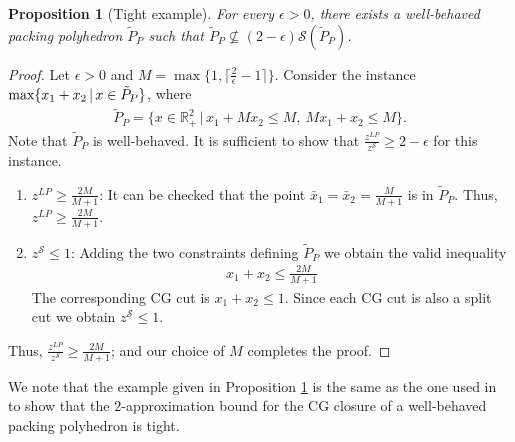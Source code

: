 \documentclass[11pt]{article}
\newcommand{\R}{\mathbb{R}}
\newcommand{\A}{\mathcal{A}}
\renewcommand{\S}{\mathcal{S}}
\newtheorem{proposition}{Proposition}
\begin{document}
\begin{proposition}[Tight example]
\label{prop:pack_TightEx}
For every $\epsilon >0$, there exists a well-behaved packing polyhedron $\tilde{P}_P$ such that $\tilde{P}_P \not\subseteq (2-\epsilon) \S(\tilde{P}_P)$. 
\end{proposition}

\begin{proof}
Let $\epsilon > 0$ and $M = \max\{1,\lceil \frac{2}{\epsilon}-1 \rceil \}$.
Consider the instance 
$\textup{max} \{ x_1 + x_2 \,|\, x \in \tilde{P}_P\}$, where 
\begin{align*}
\tilde{P}_P = \{x \in \R^2_+ \,|\, x_1 + Mx_2 \leq M, \ Mx_1 + x_2 \leq M \}.
\end{align*}
Note that $\tilde{P}_P$ is well-behaved.
It is sufficient to show that %
$\frac{z^{LP}}{z^{\S}} \ge 2 - \epsilon$ 
for this instance. 

\begin{enumerate}
\item 
$z^{LP} \ge \frac{2M}{M + 1}$: 
It can be checked that the point $\bar x_1 = \bar x_2 = \frac{M}{M + 1}$ is in $\tilde{P}_P$. %
Thus, %
$z^{LP} \ge \frac{2M}{M + 1}$. 
\item 
$z^{\S} \le1$: 
Adding the two constraints defining $\tilde{P}_P$ we obtain the valid inequality
\begin{eqnarray*} %
x_1 + x_2 \le \frac{2M}{M + 1}
\end{eqnarray*}  
The corresponding CG cut is $x_1 + x_2 \leq 1$. Since each CG cut is also a split cut we obtain $z^{\S} \le 1$.
\end{enumerate}
Thus, 
$\frac{z^{LP}}{z^{\S}} \ge \frac{2M}{M + 1}$; and our choice of $M$ completes the proof. 
\end{proof}

We note that the example given in Proposition \ref{prop:pack_TightEx} is the same as the one used in \cite{bodur2016aggregation} to show that the $2$-approximation bound for the CG closure of a well-behaved packing polyhedron is tight.
\end{document}
